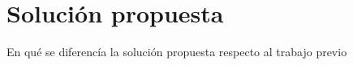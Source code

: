 \section{Solución propuesta}

 En qué se diferencía la solución propuesta respecto al trabajo previo